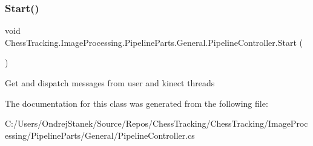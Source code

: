 \subsubsection{\texorpdfstring{Start()}{Start()}}
{\footnotesize\ttfamily void Chess\+Tracking.\+Image\+Processing.\+Pipeline\+Parts.\+General.\+Pipeline\+Controller.\+Start (\begin{DoxyParamCaption}{ }\end{DoxyParamCaption})}



Get and dispatch messages from user and kinect threads 



The documentation for this class was generated from the following file\+:\begin{DoxyCompactItemize}
\item 
C\+:/\+Users/\+Ondrej\+Stanek/\+Source/\+Repos/\+Chess\+Tracking/\+Chess\+Tracking/\+Image\+Processing/\+Pipeline\+Parts/\+General/Pipeline\+Controller.\+cs\end{DoxyCompactItemize}
